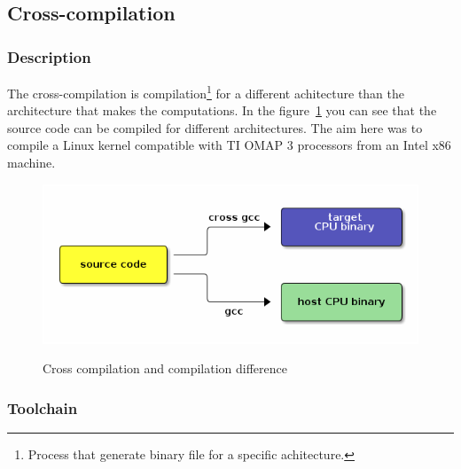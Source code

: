 	\subsection{Cross-compilation}
	\subsubsection{Description}
	\par The cross-compilation is compilation\footnote{Process that generate binary file for a specific achitecture.} for a different achitecture than the architecture that makes the computations. In the figure~\ref{cross} you can see that the source code can be compiled for different architectures. The aim here was to compile a Linux kernel compatible with TI OMAP 3 processors from an Intel x86 machine.
	\begin{figure}[h]
		\begin{center}
			\includegraphics[scale=0.5]{images_not_compressed/cross-compile.png}
			\label{cross}
			\caption{Cross compilation and compilation difference}
		\end{center}
	\end{figure}


\subsubsection{Toolchain}
	
